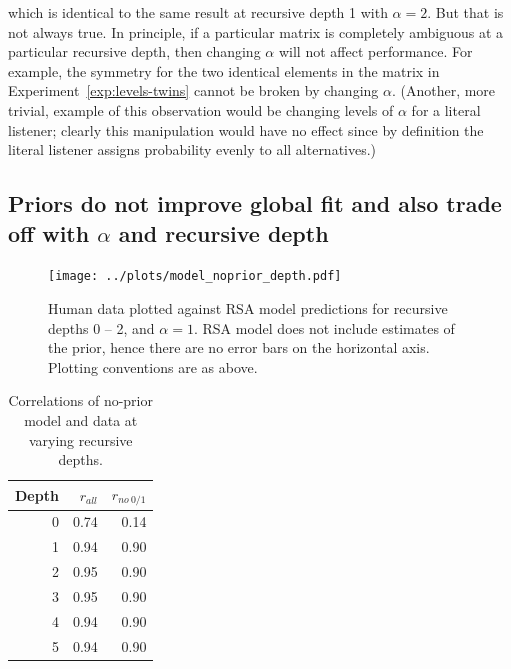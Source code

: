 \documentclass[man]{apa6}
\newcounter{Experiment}
\newcommand{\exptref}[1]{Experiment~\ref{#1}}
\begin{document}
\noindent which is identical to the same result at recursive depth 1 with $\alpha = 2$. But that is not always true. In principle, if a particular matrix is completely ambiguous at a particular recursive depth, then changing $\alpha$ will not affect performance. For example, the symmetry for the two identical elements in the matrix in \exptref{exp:levels-twins} cannot be broken by changing $\alpha$. (Another, more trivial, example of this observation would be changing levels of $\alpha$ for a literal listener; clearly this manipulation would have no effect since by definition the literal listener assigns probability evenly to all alternatives.)

\subsection{Priors do not improve global fit and also trade off with $\alpha$ and recursive depth}

\begin{figure}[t]
 \centering
 \texttt{[image: ../plots/model\_noprior\_depth.pdf]}
 \caption{\label{fig:noprior} Human data plotted against RSA model predictions for recursive depths 0 -- 2, and $\alpha=1$. RSA model does not include estimates of the prior, hence there are no error bars on the horizontal axis. Plotting conventions are as above.}
\end{figure}

\begin{table}[ht]
\centering
\begin{tabular}{rrr}
  \hline
  Depth & $r_{all}$ & $r_{no~0/1}$ \\
  \hline
  0 & 0.74 & 0.14 \\
    1 & 0.94 & 0.90 \\
    2 & 0.95 & 0.90 \\
    3 & 0.95 & 0.90 \\
    4 & 0.94 & 0.90 \\
    5 & 0.94 & 0.90 \\
   \hline
\end{tabular}
\caption{\label{tab:corrs-noprior} Correlations of no-prior model and data at varying recursive depths.}
\end{table}
\end{document}
